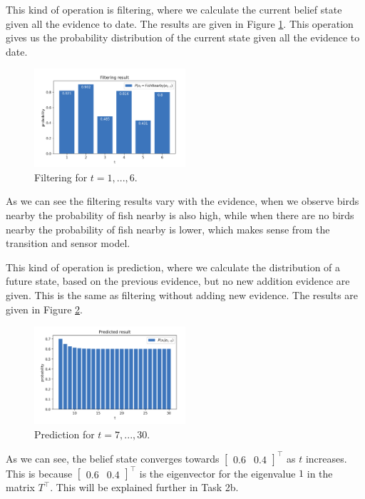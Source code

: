 \documentclass[11pt, a4paper, english]{NTNUoving}
\begin{document}
\begin{oppgave}
\begin{punkt}
    This kind of operation is filtering, where we calculate the current belief state given all the evidence to date.
    The results are given in Figure \ref{fig:filtering}. This operation gives us the probability distribution of the current state given all the evidence to date.
    \begin{figure}[H]
        \centering
        \includegraphics[width=0.5\textwidth]{filtering.png}
        \caption{Filtering for $t = 1,...,6$.}
        \label{fig:filtering}
    \end{figure}

    As we can see the filtering results vary with the evidence, when we observe birds nearby the probability of fish nearby is also high, while when there are no birds nearby
    the probability of fish nearby is lower, which makes sense from the transition and sensor model.

\end{punkt}

\begin{punkt}

    This kind of operation is prediction, where we calculate the distribution of a future state, based on the previous evidence, but no new addition evidence are given.
    This is the same as filtering without adding new evidence. The results are given in Figure \ref{fig:prediction}.
    \begin{figure}[H]
        \centering
        \includegraphics[width=0.5\textwidth]{prediction.png}
        \caption{Prediction for $t = 7,...,30$.}
        \label{fig:prediction}
    \end{figure}
    As we can see, the belief state converges towards $\begin{bmatrix}
        0.6 & 0.4
    \end{bmatrix}^\top$ as $t$ increases. This is because $\begin{bmatrix}
        0.6 & 0.4
    \end{bmatrix}^\top$ is the eigenvector for the eigenvalue $1$ in the matrix $T^\top$. This will be explained further in Task 2b.
\end{punkt}


\end{oppgave}
\end{document}
